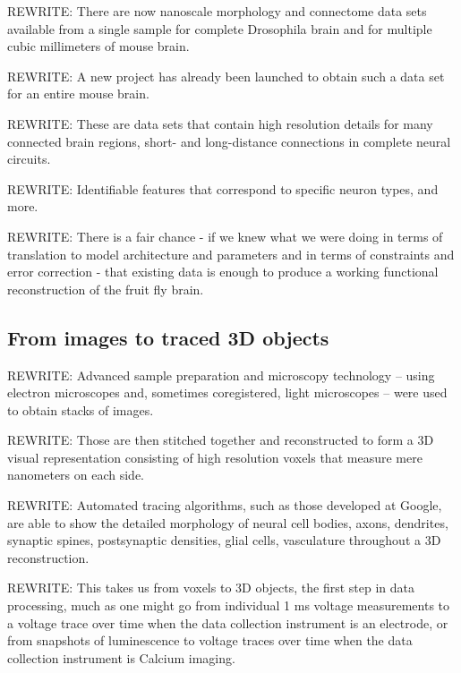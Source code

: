 \documentclass{ldr-article}
\begin{document}
\alert{REWRITE:} There are now nanoscale morphology and connectome data sets available from a single sample for complete Drosophila brain and for multiple cubic millimeters of mouse brain.

\alert{REWRITE:} A new project has already been launched to obtain such a data set for an entire mouse brain.

\alert{REWRITE:} These are data sets that contain high resolution details for many connected brain regions, short- and long-distance connections in complete neural circuits.

\alert{REWRITE:} Identifiable features that correspond to specific neuron types, and more.

\alert{REWRITE:} There is a fair chance - if we knew what we were doing in terms of translation to model architecture and parameters and in terms of constraints and error correction - that existing data is enough to produce a working functional reconstruction of the fruit fly brain.

\subsection{From images to traced 3D objects}

\alert{REWRITE:} Advanced sample preparation and microscopy technology – using electron microscopes and, sometimes coregistered, light microscopes – were used to obtain stacks of images.

\alert{REWRITE:} Those are then stitched together and reconstructed to form a 3D visual representation consisting of high resolution voxels that measure mere nanometers on each side.

\alert{REWRITE:} Automated tracing algorithms, such as those developed at Google, are able to show the detailed morphology of neural cell bodies, axons, dendrites, synaptic spines, postsynaptic densities, glial cells, vasculature throughout a 3D reconstruction.

\alert{REWRITE:} This takes us from voxels to 3D objects, the first step in data processing, much as one might go from individual 1 ms voltage measurements to a voltage trace over time when the data collection instrument is an electrode, or from snapshots of luminescence to voltage traces over time when the data collection instrument is Calcium imaging.


\end{document}
